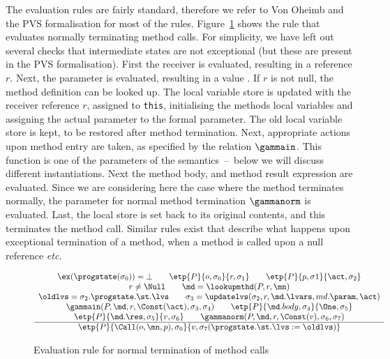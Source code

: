 The evaluation rules are fairly standard, therefore we refer to Von
Oheimb and the PVS formalisation for most of the
rules. Figure~\ref{FigEvalRules} shows the rule that evaluates
normally terminating method calls. For simplicity, we have left out
several checks that intermediate states are not exceptional (but these
are present in the PVS formalisation). First the receiver is
evaluated, resulting in a reference \(r\). Next, the parameter is
evaluated, resulting in a value \act. If \(r\) is not null, the method
definition \md can be looked up. The local variable store is updated
with the receiver reference \(r\), assigned to \texttt{this},
initialising the methods local variables and assigning the actual
parameter to the formal parameter. The old local variable store is
kept, to be restored after method termination. Next, appropriate
actions upon method entry are taken, as specified by the relation
\(\gammain\). This function is one of the parameters of the
semantics~--~below we will discuss different instantiations. Next the
method body, and method result expression are evaluated. Since we are
considering here the case where the method terminates normally, the
parameter for normal method termination \(\gammanorm\) is
evaluated. Last, the local store is set back to its original contents,
and this terminates the method call. Similar rules exist that describe
what happens upon exceptional termination of a method, when a method
is called upon a null reference \emph{etc.}



\begin{figure}[t]
\[
\begin{array}{c}
\ex(\progstate(\sigma_0)) = \bot \qquad %
\etp{P}{o, \sigma_0}{r,\sigma_1} \qquad      %
\etp{P}{p, \sigma1}{\act, \sigma_2}\\          %
r \not= \Null \qquad                    %
\md = \lookupmthd(P, r, \mn) \\
\oldlvs = \sigma_2.\progstate.\st.\lvs \qquad
\sigma_3 = \updatelvs(\sigma_2, r, \md.\lvars, md.\param, \act) \\
\gammain(P, \md, r, \Const(\act), \sigma_3, \sigma_4) \qquad
\etp{P}{\md.body, \sigma_4}{\One,\sigma_5} \\
\etp{P}{\md.\res, \sigma_5}{v,\sigma_6}\qquad
\gammanorm(P, \md, r, \Const(v), \sigma_6, \sigma_7)\\
\hline
\etp{P}{\Call(o,\mn,p), \sigma_0}{v, \sigma_7
(\progstate.\st.\lvs := \oldlvs)}
\end{array}
\]
\caption{Evaluation rule for normal termination of method
calls}\label{FigEvalRules}
\end{figure}


